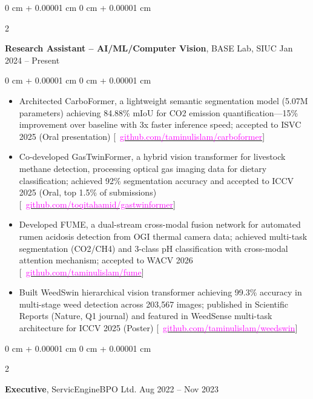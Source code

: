 \documentclass[9pt, letterpaper]{article}
\newenvironment{highlights}{
    \begin{itemize}[
        topsep=0.05 cm,
        parsep=0.05 cm,
        partopsep=0pt,
        itemsep=0pt,
        leftmargin=0 cm + 10pt
    ]
}{
    \end{itemize}
} %
\newenvironment{onecolentry}{
    \begin{adjustwidth}{
        0 cm + 0.00001 cm
    }{
        0 cm + 0.00001 cm
    }
}{
    \end{adjustwidth}
} %
\newenvironment{twocolentry}[2][]{
    \onecolentry
    \def\secondColumn{#2}
    \setcolumnwidth{\fill, 4.5 cm}
    \begin{paracol}{2}
}{
    \switchcolumn \raggedleft \secondColumn
    \end{paracol}
    \endonecolentry
} %
\begin{document}
        \begin{twocolentry}{
            Jan 2024 – Present
        }
            \textbf{Research Assistant -- AI/ML/Computer Vision}, BASE Lab, SIUC\end{twocolentry}
        \vspace{0.05 cm}
        \begin{onecolentry}
\begin{highlights}
    \item Architected CarboFormer, a lightweight semantic segmentation model (5.07M parameters) achieving 84.88\% mIoU for CO2 emission quantification—15\% improvement over baseline with 3x faster inference speed; accepted to ISVC 2025 (Oral presentation)
    {[\small \faGithub\ \href{https://github.com/taminulislam/carboformer}{\textcolor{magenta}{github.com/taminulislam/carboformer}}]}
    
    \item Co-developed GasTwinFormer, a hybrid vision transformer for livestock methane detection, processing optical gas imaging data for dietary classification; achieved 92\% segmentation accuracy and accepted to ICCV 2025 (Oral, top 1.5\% of submissions)
    {[\small \faGithub\ \href{https://github.com/toqitahamid/controlled-diet-methane-dataset-tools}{\textcolor{magenta}{github.com/toqitahamid/gastwinformer}}]}
    
    \item Developed FUME, a dual-stream cross-modal fusion network for automated rumen acidosis detection from OGI thermal camera data; achieved multi-task segmentation (CO2/CH4) and 3-class pH classification with cross-modal attention mechanism; accepted to WACV 2026
    {[\small \faGithub\ \href{https://github.com/taminulislam/fume}{\textcolor{magenta}{github.com/taminulislam/fume}}]}
    
    \item Built WeedSwin hierarchical vision transformer achieving 99.3\% accuracy in multi-stage weed detection across 203,567 images; published in Scientific Reports (Nature, Q1 journal) and featured in WeedSense multi-task architecture for ICCV 2025 (Poster)
    {[\small \faGithub\ \href{https://github.com/taminulislam/weedswin}{\textcolor{magenta}{github.com/taminulislam/weedswin}}]}
\end{highlights}
        \end{onecolentry}
        \vspace{0.1 cm}

         \begin{twocolentry}{
    Aug 2022 – Nov 2023
}
    \textbf{Executive}, ServicEngineBPO Ltd.\end{twocolentry}
\end{document}
